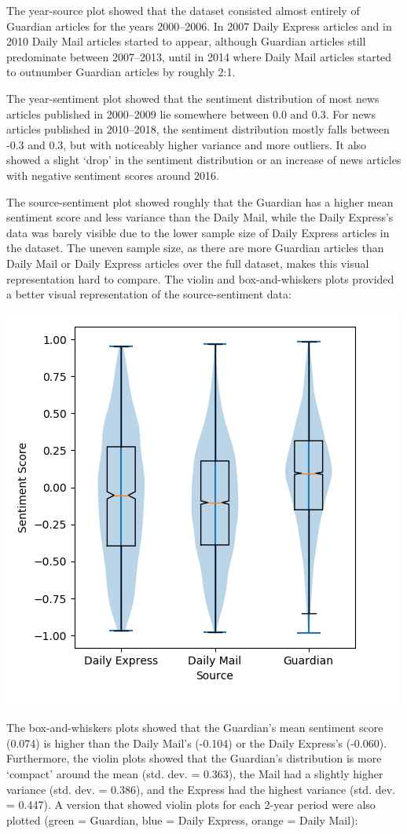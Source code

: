 \documentclass{report}
\begin{document}
The year-source plot showed that the dataset consisted almost entirely of Guardian articles for the years 2000--2006. In 2007 Daily Express articles and in 2010 Daily Mail articles started to appear, although Guardian articles still predominate between 2007--2013, until in 2014 where Daily Mail articles started to outnumber Guardian articles by roughly 2:1.

The year-sentiment plot showed that the sentiment distribution of most news articles published in 2000--2009 lie somewhere between 0.0 and 0.3.
For news articles published in 2010--2018, the sentiment distribution mostly falls between -0.3 and 0.3, but with noticeably higher variance and more outliers. 
It also showed a slight `drop' in the sentiment distribution or an increase of news articles with negative sentiment scores around 2016.

The source-sentiment plot showed roughly that the Guardian has a higher mean sentiment score and less variance than the Daily Mail, while the Daily Express's data was barely visible due to the lower sample size of Daily Express articles in the dataset.
The uneven sample size, as there are more Guardian articles than Daily Mail or Daily Express articles over the full dataset, makes this visual representation hard to compare. 
The violin \cite{hintze1998violin} and box-and-whiskers plots \cite{tukey1977exploratory} provided a better visual representation of the source-sentiment data:

\begin{center}
	\includegraphics[width=0.5\linewidth]{row-3-col-1.png}
\end{center}

The box-and-whiskers plots showed that the Guardian's mean sentiment score (0.074) is higher than the Daily Mail's (-0.104) or the Daily Express's (-0.060).
Furthermore, the violin plots showed that the Guardian's distribution is more `compact' around the mean (std. dev. = 0.363), the Mail had a slightly higher variance (std. dev. = 0.386), and the Express had the highest variance (std. dev. = 0.447). A version that showed violin plots for each 2-year period were also plotted (green = Guardian, blue = Daily Express, orange = Daily Mail):
\end{document}
